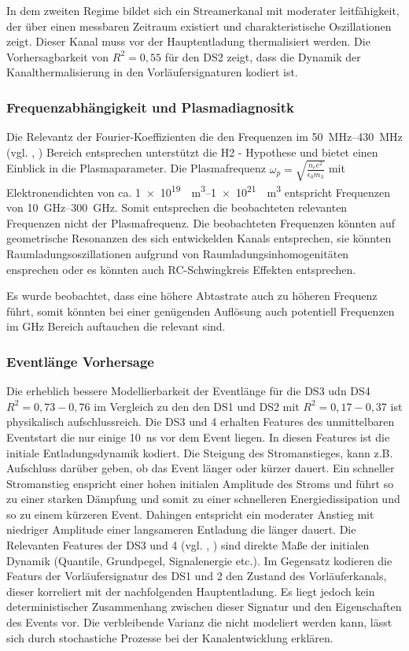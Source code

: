In dem zweiten Regime bildet sich ein Streamerkanal mit moderater leitfähigkeit, der über einen messbaren Zeitraum existiert und charakteristische Oszillationen zeigt. Dieser Kanal muss vor der Hauptentladung thermalisiert werden. Die Vorhersagbarkeit von \(R^2 = 0,55\) für den DS2 zeigt, dass die Dynamik der Kanalthermalisierung in den Vorläufersignaturen kodiert ist.

\subsubsection{Frequenzabhängigkeit und Plasmadiagnositk}
Die Relevantz der Fourier-Koeffizienten die den Frequenzen im \SIrange{50}{430}{\mega\hertz} (vgl. , ) Bereich entsprechen unterstützt die H2 - Hypothese und bietet einen Einblick in die Plasmaparameter. Die Plasmafrequenz \(\omega_p = \sqrt{\frac{n_e e^2}{\epsilon_0 m_3}}\) mit Elektronendichten von ca.  \SIrange{1e19}{1e21}{\per\cubic\metre} entspricht Frequenzen von \SIrange{10}{300}{\giga\hertz}. Somit entsprechen die beobachteten relevanten Frequenzen nicht der Plasmafrequenz. Die beobachteten Frequenzen könnten auf geometrische Resonanzen des sich entwickelden Kanals entsprechen, sie könnten Raumladungsoszillationen aufgrund von Raumladungsinhomogenitäten ensprechen oder es könnten auch RC-Schwingkreis Effekten entsprechen. 

Es wurde beobachtet, dass eine höhere Abtastrate auch zu höheren Frequenz führt, somit könnten bei einer genügenden Auflösung auch potentiell Frequenzen im GHz Bereich auftauchen die relevant sind. 

\subsubsection{Eventlänge Vorhersage}
Die erheblich bessere Modellierbarkeit der Eventlänge für die DS3 udn DS4 \(R^2 = 0,73-0,76\) im Vergleich zu den den DS1 und DS2 mit \(R^2 = 0,17-0,37\) ist physikalisch aufschlussreich.
Die DS3 und 4 erhalten Features des unmittelbaren Eventstart die nur einige \SI{10}{\nano\second} vor dem Event liegen. In diesen Features ist die initiale Entladungsdynamik kodiert. Die Steigung des Stromanstieges, kann z.B. Aufschluss darüber geben, ob das Event länger oder kürzer dauert. Ein schneller Stromanstieg enspricht einer hohen initialen Amplitude des Stroms und führt so zu einer starken Dämpfung und somit zu einer schnelleren Energiedissipation und so zu einem kürzeren Event. Dahingen entspricht ein moderater Anstieg mit niedriger Amplitude einer langsameren Entladung die länger dauert. Die Relevanten Features der DS3 und 4 (vgl. , ) sind direkte Maße der initialen Dynamik (Quantile, Grundpegel, Signalenergie etc.). Im Gegensatz kodieren die Featurs der Vorläufersignatur des DS1 und 2 den Zustand des Vorläuferkanals, dieser korreliert mit der nachfolgenden Hauptentladung. Es liegt jedoch kein deterministischer Zusammenhang zwischen dieser Signatur und den Eigenschaften des Events vor. Die verbleibende Varianz die nicht modeliert werden kann, lässt sich durch stochastiche Prozesse bei der Kanalentwicklung erklären. 

